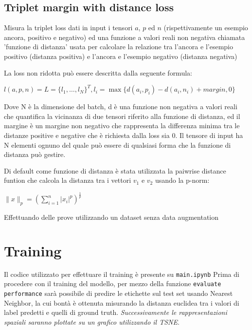 \documentclass[11pt]{article}
\begin{document}
\subsection{Triplet margin with distance loss}
Misura la triplet loss dati in input i tensori $a$, $p$ ed $n$ (rispettivamente un esempio ancora, positivo e negativo) ed una funzione a valori
reali non negativa chiamata 'funzione di distanza' usata per calcolare la relazione tra l'ancora e l'esempio positivo (distanza positiva) e l'ancora e l'esempio negativo (distanza negativa)

La loss non ridotta può essere descritta dalla seguente formula:

\begin{center}
    $l(a,p,n) = L = { \{ l_1, \ldots, l_N \}}^T, l_i = \max{\{ d(a_i, p_i) - d(a_i, n_i) + margin, 0 \}} $
\end{center}

Dove N è la dimensione del batch, d è una funzione non negativa a valori reali che quantifica la vicinanza di due tensori riferito alla funzione di distanza,
ed il margine è un margine non negativo che rappresenta la differenza minima tra le distanze positive e negative che è richiesta dalla loss sia 0.
Il tensore di input ha N elementi ognuno del quale può essere di qualsiasi forma che la funzione di distanza può gestire.

Di default come funzione di distanza è stata utilizzata la paiwrise distance funtion che calcola la distanza tra i vettori $v_1$ e $v_2$ usando la p-norm:

\begin{center}
    $ \| x \| _p = ( \sum^n_{i=1} |x_i|^p )^{\frac{1}{p}} $
\end{center}

Effettuando delle prove utilizzando un dataset senza data augmentation 


\section{Training}

Il codice utilizzato per effettuare il training è presente su \texttt{main.ipynb}
Prima di procedere con il training del modello, per mezzo della funzione \texttt{evaluate performance} sarà possibile di predire le etichette sul test set usando Nearest Neighbor, la cui bontà è ottenuta misurando la distanza euclidea tra i valori di label predetti e quelli di ground truth. \textit{Successivamente le rappresentazioni spaziali saranno plottate su un grafico utilizzando il TSNE}.
\end{document}
